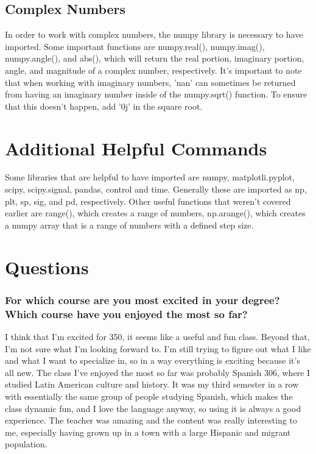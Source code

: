 \documentclass[12pt]{report}
\begin{document}
 \subsection{Complex Numbers}
 
 In order to work with complex numbers, the numpy library is necessary to have imported. Some important functions are numpy.real(), numpy.imag(), numpy.angle(), and abs(), which will return the real portion, imaginary portion, angle, and magnitude of a complex number, respectively. It's important to note that when working with imaginary numbers, 'nan' can sometimes be returned from having an imaginary number inside of the numpy.sqrt() function. To ensure that this doesn't happen, add '0j' in the square root.
 
\section{Additional Helpful Commands}
 
 Some libraries that are helpful to have imported are numpy, matplotli.pyplot, scipy, scipy.signal, pandas, control and time. Generally these are imported as np, plt, sp, sig, and pd, respectively. Other useful functions that weren't covered earlier are range(), which creates a range of numbers, np.arange(), which creates a numpy array that is a range of numbers with a defined step size. 
 
\section{Questions}
\subsubsection{For which course are you most excited in your degree? Which course have you enjoyed the most so far?}
 
I think that I'm excited for 350, it seems like a useful and fun class. Beyond that, I'm not sure what I'm looking forward to. I'm still trying to figure out what I like and what I want to specialize in, so in a way everything is exciting because it's all new. The class I've enjoyed the most so far was probably Spanish 306, where I studied Latin American culture and history. It was my third semester in a row with essentially the same group of people studying Spanish, which makes the class dynamic fun, and I love the language anyway, so using it is always a good experience. The teacher was amazing and the content was really interesting to me, especially having grown up in a town with a large Hispanic and migrant population. 
 
\end{document}
